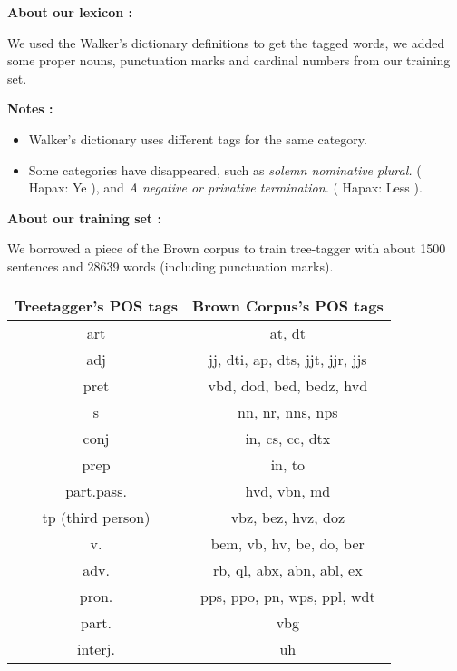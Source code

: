 \centerline{\textbf{ About our lexicon :}}

	\vspace{0.5mm}
	
	We used the Walker's dictionary definitions to get the tagged words, we added some proper nouns, punctuation marks and cardinal numbers from our training set.
	
	\vspace{2mm}

\centerline{\textbf{Notes :}}

\begin{itemize}
	\item Walker's dictionary uses different tags for the same category.
	\item Some categories have disappeared, such as \textit{solemn nominative plural.} ( Hapax: Ye ), and \textit{A negative or privative termination.} ( Hapax: Less ).
\end{itemize}

		\vspace{2mm}

\centerline{\textbf{About our training set : }}
	\vspace{0.5mm}

	We borrowed a piece of the Brown corpus to train tree-tagger with about 1500 sentences and 28639 words (including punctuation marks).

\begin{center}
\begin{tabular}{c|c}
\hline
 \rowcolor[gray]{.75}
\textbf{Treetagger's POS tags} &  \textbf{Brown Corpus's POS tags} \\
\hline
art  &  at, dt \\
\hline
adj  &  jj, dti, ap, dts, jjt, jjr, jjs \\
\hline
pret  &  vbd, dod, bed, bedz, hvd \\
\hline
s  &  nn, nr, nns, nps \\
\hline
conj  &  in, cs, cc, dtx \\
\hline
prep  &  in, to \\
\hline
part.pass.  &  hvd, vbn, md \\
\hline
tp (third person)  &  vbz, bez, hvz, doz \\
\hline
v.  &  bem, vb, hv, be, do, ber \\
\hline
adv.  &   rb, ql, abx, abn, abl, ex \\
\hline
pron.  &  pps, ppo, pn, wps, ppl, wdt \\
\hline
part.  &  vbg \\
\hline
interj.  &  uh \\
\hline
\end{tabular}
\end{center}
